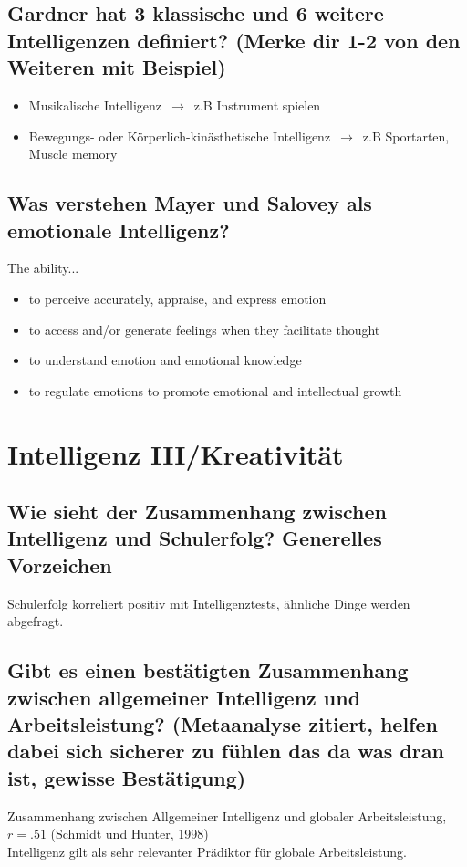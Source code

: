 \documentclass[a6paper,10pt,DIV=40]{scrartcl}
\begin{document}
\subsection{Gardner hat 3 klassische und 6 weitere Intelligenzen definiert? (Merke dir 1-2 von den Weiteren mit Beispiel)}
\begin{itemize}
\item Musikalische Intelligenz $\,\to\,$ z.B Instrument spielen
\item Bewegungs- oder Körperlich-kinästhetische Intelligenz $\,\to\,$ z.B Sportarten, Muscle memory
\end{itemize}
\subsection{Was verstehen Mayer und Salovey als emotionale Intelligenz?}
The ability...
\begin{itemize}
\item to perceive accurately, appraise, and express emotion
\item to access and/or generate feelings when they facilitate thought
\item to understand emotion and emotional knowledge
\item to regulate emotions to promote emotional and intellectual growth
\end{itemize}

\section{Intelligenz III/Kreativität}

\subsection{Wie sieht der Zusammenhang zwischen Intelligenz und Schulerfolg? Generelles Vorzeichen}
    Schulerfolg korreliert positiv mit Intelligenztests, ähnliche Dinge werden abgefragt.
\subsection{Gibt es einen bestätigten Zusammenhang zwischen allgemeiner Intelligenz und Arbeitsleistung? (Metaanalyse zitiert, helfen dabei sich sicherer zu fühlen das da was dran ist, gewisse Bestätigung)}
    Zusammenhang zwischen Allgemeiner Intelligenz und globaler Arbeitsleistung, $r = .51$ (Schmidt und Hunter, 1998)\\
    Intelligenz gilt als sehr relevanter Prädiktor für globale Arbeitsleistung.
\end{document}
